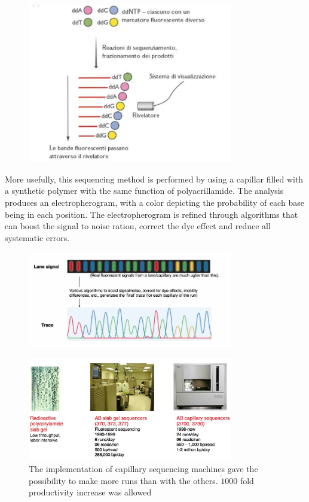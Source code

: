     \begin{figure}[h]
        \caption{}
        \centering
        \includegraphics[width=0.8\textwidth]{automaticSang}
        \label{}
    \end{figure}

    More usefully, this sequencing method is performed by using a capillar filled with a synthetic polymer with the same function of polyacrillamide.
    The analysis produces an electropherogram, with a color depicting the probability of each base being in each position.
    The electropherogram is refined through algorithms that can boost the signal to noise ration, correct the dye effect and reduce all systematic errors.

        \begin{figure}[h]
        \caption{}
        \centering
        \includegraphics[width=0.8\textwidth]{elettroferogramma}
        \label{}
    \end{figure}

    \begin{figure}[h]
        \centering
        \includegraphics[width=0.8\textwidth]{progressSangerMachines}
        \caption{The implementation of capillary sequencing machines gave the possibility to make more runs than with the others.
                    $\tilde 1000$ fold productivity increase was allowed
                }
        \label{}
    \end{figure}

